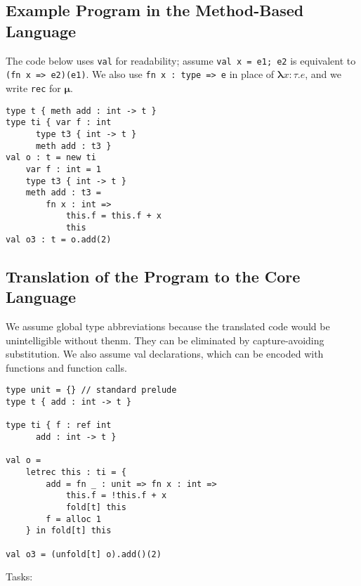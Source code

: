 
\newpage 

\subsection{Example Program in the Method-Based Language}

The code below uses \lstinline!val! for readability; assume \lstinline!val x = e1; e2! is equivalent to \lstinline!(fn x => e2)(e1)!.  We also use \lstinline!fn x : type => e! in place of $\boldsymbol\lambda x{:}\tau . e$, and we write \lstinline!rec! for $\boldsymbol\mu$.

\begin{lstlisting}
type t { meth add : int -> t }
type ti { var f : int
	  type t3 { int -> t }
	  meth add : t3 }
val o : t = new ti
	var f : int = 1
	type t3 { int -> t }
	meth add : t3 =
		fn x : int =>
			this.f = this.f + x
			this
val o3 : t = o.add(2)
\end{lstlisting}


\subsection{Translation of the Program to the Core Language}

We assume global type abbreviations because the translated code would be unintelligible without thenm.  They can be eliminated by capture-avoiding substitution.  We also assume val declarations, which can be encoded with functions and function calls.

\begin{lstlisting}
type unit = {} // standard prelude
type t { add : int -> t }
	
type ti { f : ref int
	  add : int -> t }
	
val o =
	letrec this : ti = {
		add = fn _ : unit => fn x : int =>
			this.f = !this.f + x
			fold[t] this
		f = alloc 1
	} in fold[t] this

val o3 = (unfold[t] o).add()(2)
\end{lstlisting}

Tasks:

